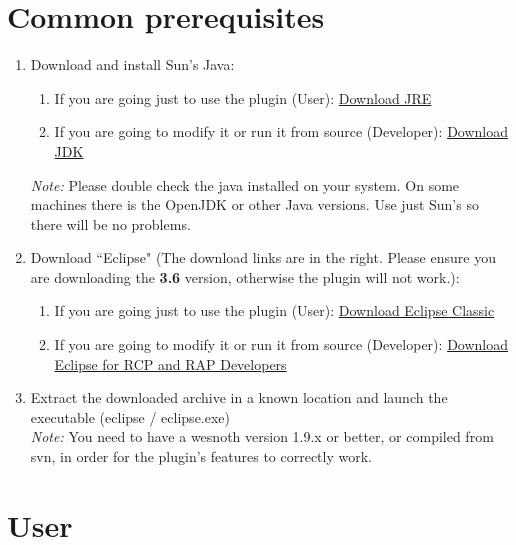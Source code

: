 \documentclass[10pt]{article}
\begin{document}
\section{Common prerequisites}
\begin{enumerate}
\item Download and install Sun's Java:
\begin{enumerate}
\item If you are going just to use the plugin (User): \href{https://cds.sun.com/is-bin/INTERSHOP.enfinity/WFS/CDS-CDS_Developer-Site/en_US/-/USD/ViewProductDetail-Start?ProductRef=jre-6u21-oth-JPR@CDS-CDS_Developer}{Download JRE}
\item If you are going to modify it or run it from source (Developer): \href{http://java.sun.com/javase/downloads/widget/jdk6.jsp}{Download JDK}
\end{enumerate}
\textit{Note:} Please double check the java installed on your system. On some machines there is the OpenJDK or other Java versions. Use just Sun's so there will be no problems.
\item Download ``Eclipse" (The download links are in the right. Please ensure you are downloading the \textbf{3.6} version, otherwise the plugin will not work.):
\begin{enumerate}
\item If you are going just to use the plugin (User): \href{http://eclipse.org/downloads/packages/eclipse-classic-360/heliosr}{Download Eclipse Classic}
\item If you are going to modify it or run it from source (Developer):  \href{http://eclipse.org/downloads/packages/eclipse-rcp-and-rap-developers/heliosr}{Download Eclipse for RCP and RAP Developers}
\end{enumerate}
\item Extract the downloaded archive in a known location and launch the executable (eclipse / eclipse.exe)\\
\textit{Note:} You need to have a wesnoth version 1.9.x or better, or compiled from svn, in order for the plugin's features to correctly work.
\end{enumerate}

\section{User}
\end{document}
